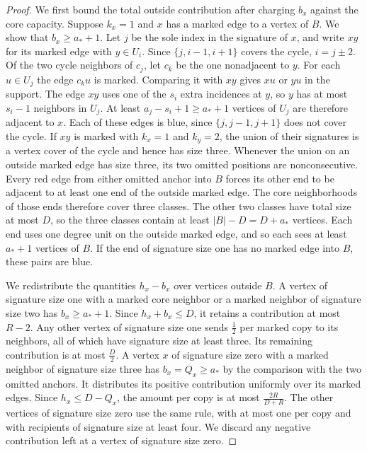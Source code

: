 \begin{proof}
We first bound the total outside contribution after charging $b_x$ against
the core capacity. Suppose $k_x=1$ and $x$ has a marked edge to a vertex of $B$.
We show that $b_x\ge a_*+1$. Let $j$ be the sole index in the signature of $x$, and write $xy$ for
its marked edge with $y\in U_i$. Since $\{j,i-1,i+1\}$ covers the
cycle, $i=j\pm2$. Of the two cycle neighbors of $c_j$, let $c_k$
be the one nonadjacent to $y$. For each $u\in U_j$ the edge $c_ku$
is marked. Comparing it with $xy$ gives $xu$ or $yu$ in the support.
The edge $xy$ uses one of the $s_i$ extra incidences at $y$, so
$y$ has at most $s_i-1$ neighbors in $U_j$. At least
$a_j-s_i+1\ge a_*+1$ vertices of $U_j$ are therefore adjacent to
$x$. Each of these edges is blue, since $\{j,j-1,j+1\}$ does not
cover the cycle. If $xy$ is marked with $k_x=1$ and $k_y=2$, the union of their
signatures is a vertex cover of the cycle and hence has size three.
Whenever the union on an outside marked edge has size three, its two
omitted positions are nonconsecutive. Every red edge from either
omitted anchor into $B$ forces its other end to be adjacent to at least
one end of the outside marked edge. The core neighborhoods of those
ends therefore cover three classes. The other two classes have total
size at most $D$, so the three classes contain at least $|B|-D=D+a_*$
vertices. Each end uses one degree unit on the outside marked edge,
and so each sees at least $a_*+1$ vertices of $B$. If the end of
signature size one has no marked edge into $B$, these pairs are blue.

We redistribute the quantities $h_x-b_x$ over vertices outside $B$.
A vertex of signature size one with a marked core neighbor or a
marked neighbor of signature size two has $b_x\ge a_*+1$. Since
$h_x+b_x\le D$, it retains a contribution at most $R-2$. Any other
vertex of signature size one sends $\frac{1}{2}$ per marked copy to
its neighbors, all of which have signature size at least three. Its
remaining contribution is at most $\frac{D}{2}$. A vertex $x$ of
signature size zero with a marked neighbor of signature size three
has $b_x=Q_x\ge a_*$ by the comparison with the two omitted anchors.
It distributes its positive contribution uniformly over its marked
edges. Since $h_x\le D-Q_x$, the amount per copy is at most
$\frac{2R}{D+R}$. The other vertices of signature size zero use the
same rule, with at most one per copy and with recipients of
signature size at least four. We discard any negative contribution
left at a vertex of signature size zero.


\end{proof}
